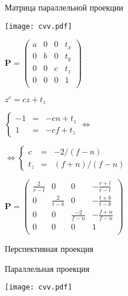 \documentclass[10pt]{beamer}
\begin{document}
	\begin{frame}{Матрица параллельной проекции}
		
		\centering
		\texttt{[image: cvv.pdf]}
		
		{
			$\mathbf P =
			\begin{pmatrix}
				a& 0& 0& t_x \\
				0& b& 0& t_y \\
				0& 0& c& t_z \\
				0& 0& 0& 1 \\
			\end{pmatrix}
			$
			
			$z^c = cz+t_z $
			
			$ \left\lbrace
			\begin{array}{rcl}
				-1 &= & -cn + t_z \\
				1& = & -cf + t_z
			\end{array}
			 \right. \Leftrightarrow $
			 
			 $ \Leftrightarrow \left\lbrace
			 \begin{array}{rcl}
			 	c &  = & -2/(f-n) \\
			 	t_z& = & (f+n)/(f-n)
			 \end{array}
			 \right. $
		}
		{
			$\mathbf P =
			\begin{pmatrix}
				\frac{2}{r-l}& 0& 0& -\frac{r+l}{r-l} \\
				0& \frac{2}{t-b}& 0& -\frac{t+b}{t-b} \\
				0& 0& \frac{-2}{f-n}& -\frac{f+n}{f-n} \\
				0& 0& 0& 1 \\
			\end{pmatrix}
			$
		}
		

		
		
		
		
	\end{frame}
	
	

	
	\begin{frame}
		
		{
			\centering
			
		}
		{
			\centering
			
			Перспективная проекция
			
			
			Параллельная проекция
			
			\texttt{[image: cvv.pdf]}
		}
		
	\end{frame}
	
\end{document}
